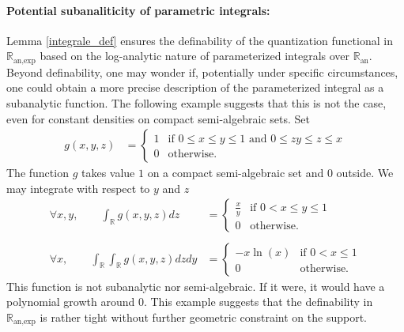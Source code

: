 \documentclass[11pt]{article}
\newcommand{\R}{\mathbb R}
\newcommand{\1}{\mathbbm{1}}
\numberwithin{equation}{section}
\begin{document}
\paragraph{Potential subanaliticity of parametric integrals:}    
Lemma \ref{integrale_def} ensures the definability of the quantization functional in $\R_{\text{an,exp}}$ based on the log-analytic nature of parameterized integrals over $\mathbb{R}_{\text{an}}$. Beyond definability, one may wonder if, potentially under specific circumstances, one could obtain a more precise description of the parameterized integral as a subanalytic function. The following example suggests that this is not the case, even for constant densities on compact semi-algebraic sets. Set
\begin{align*}
    g(x,y,z) &= 
    \begin{cases}
        1 & \text{if } 0 \leq x \leq y \leq 1 \text{   and   } 0 \leq zy  \leq z \leq x\\
        0& \text{otherwise.}
    \end{cases}
\end{align*}
The function $g$ takes value $1$ on a compact semi-algebraic set and $0$ outside. We may integrate with respect to $y$ and $z$
\begin{align*}
    \forall x,y, \qquad \int_\R g(x,y,z) dz &= 
    \begin{cases}
        \frac{x}{y} & \text{if } 0 < x \leq y \leq 1 \\
        0& \text{otherwise.}
    \end{cases}\\
\\
    \forall x, \qquad \int_\R\int_\R g(x,y,z) dzdy &=  
    \begin{cases}
        -x \ln(x) & \text{if } 0 < x  \leq 1 \\
        0& \text{otherwise.}
    \end{cases}
\end{align*}
This function is not subanalytic nor semi-algebraic. If it were, it would have a polynomial growth around $0$. This example suggests that the definability in $\mathbb{R}_{\text{an,exp}}$ is rather tight without further geometric constraint on the support. 
\end{document}
